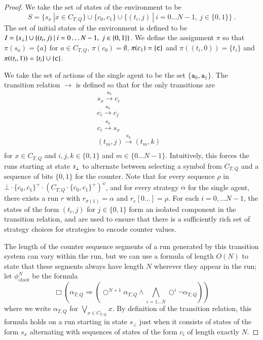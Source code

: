 \documentclass[a4wide]{article}
\newcommand{\trans}{\rightarrow}
\newcommand{\ptrans}[1]{\stackrel{#1}{\longrightarrow}}
\theoremstyle{examplesty}
\newcommand{\strat}{\sigma}
\newcommand{\rimp}{\Rightarrow}
\newcommand{\nxt}{\Circle}
\begin{document}
\begin{proof}
We take the set of states of the environment to be 
$$S= \{ s_x~|x \in C_{T,Q} \}\cup \{c_0,c_1\}\cup \{(t_i,j)~|~ i = 0  \ldots N-1, ~j\in \{0,1\}\}~. $$ 
The set of initial states of the environment is defined to be $I = \{ s_\bot \} \cup 
\{(t_i,j)~|~ i = 0  \ldots N-1, ~j\in \{0,1\}\}$. 
We define the assignment $\pi$ so that 
$\pi(s_a) = \{a\}$ for 
$a \in C_{T,Q}$, 
$\pi(c_0) = \emptyset$, $\pi(c_1) = \{\mathtt{c}\}$
and $\pi((t_i,0)) = \{t_i\}$ and $\pi((t_i,1)) = \{t_i\}  \cup \{\mathtt{c}\}$. 


We take the set of actions of the single agent to be the set $\{\mathtt{a}_0,\mathtt{a}_1\}$.
The transition relation $\trans$ is defined so that for 
the only transitions are 
$$
\begin{array}{ll} 
 s_x \ptrans{a_k} c_i  & \\ c_i \ptrans{a_k} c_j &  \\ c_i \ptrans{a_k} s_x & \\ (t_m,j) \ptrans{a_k} (t_m,k) \\ \end{array}$$
for  $x\in C_{T,Q}$ and  
$i,j,k\in \{0,1\}$ and   $m\in \{ 0\ldots N-1\}$. 
Intuitively, this forces the runs starting at state $s_\bot$ to alternate between selecting 
a symbol from $C_{T,Q}$ and a sequence of bits $\{0,1\}$ 
for the counter. 
Note that for every sequence $\rho$ in $\bot \cdot \{c_0,c_1\}^+ \cdot  (C_{T,Q} \cdot \{c_0,c_1\}^+)^\omega$, 
and for every strategy $\alpha$ for the single agent, 
there exists a run $r$ with $r_{\strat(1)} = \alpha$ and $r_e[0 \ldots] = \rho$. 
For each 
$i = 0,\ldots N-1$, 
the 
states of the form $(t_i,j)$ for $j\in \{0,1\}$ 
form an isolated component in the 
transition relation, and are used to ensure that there is a sufficiently rich 
set of strategy choices for strategies to encode counter values. 




The length of the counter sequence segments of a run generated by this transition
system can vary within the run, but we can use a formula of length 
$O(N)$
to state that these segments always 
have length $N$ wherever they appear in the run; let $\phi^N_{clock}$ be the formula  
$$ \Box (\alpha_{T,Q}  \rimp (\nxt^{N+1} \alpha_{T,Q} \land \bigwedge_{i=1\ldots N} \nxt^i \neg \alpha_{T,Q} ))$$
where we write $\alpha_{T,Q}$ for $\bigvee_{x \in C_{T,Q}} x$. 
By definition of the transition relation, this formula holds on  a run starting in state $s_\bot$ just when 
it consists of states of the form $s_x$ alternating with sequences of states of the form $c_i$
of length exactly $N$. 


\end{proof}
\end{document}
